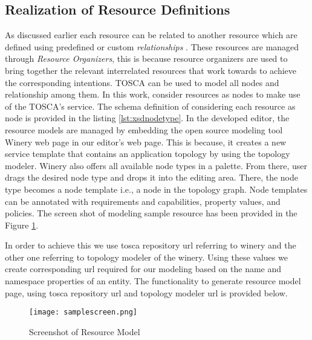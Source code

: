 \subsection{Realization of Resource Definitions}
As discussed earlier each resource can be related to another resource which are defined using predefined or custom \textit{relationships} \cite{Sungur2014a}. These resources are managed through \textit{Resource Organizers}, this is because resource organizers are used to bring together the relevant interrelated resources that work towards to achieve the corresponding intentions. TOSCA \cite{Binz2014} can be used to model all nodes and relationship among them. In this work, consider resources as nodes to make use of the TOSCA's service. The schema definition of considering each resource as node is provided in the listing \ref{lst:xsdnodetype}. In the developed editor, the resource models are managed by embedding the open source modeling tool Winery web page \cite{Kopp2013} in our editor's web page. This is because, it creates a new service template that contains an application topology by using the topology modeler. Winery also offers all available node types in a palette. From there, user drags the desired node type and drops it into the editing area. There, the node type
becomes a node template i.e., a node in the topology graph. Node templates can be annotated with requirements and capabilities, property values, and policies. The screen shot of modeling sample resource has been provided in the Figure \ref{fig:realizationofresourcemodel}. 

In order to achieve this we use tosca repository url referring to winery and the other one referring to topology modeler of the winery. Using these values we create corresponding url required for our modeling based on the name and namespace properties of an entity. The functionality to generate resource model page, using tosca repository url and topology modeler url is provided below.

			
			
\begin{figure}
	\centering
	\texttt{[image: samplescreen.png]}
	\caption{Screenshot of Resource Model}
	\label{fig:realizationofresourcemodel}
\end{figure}


